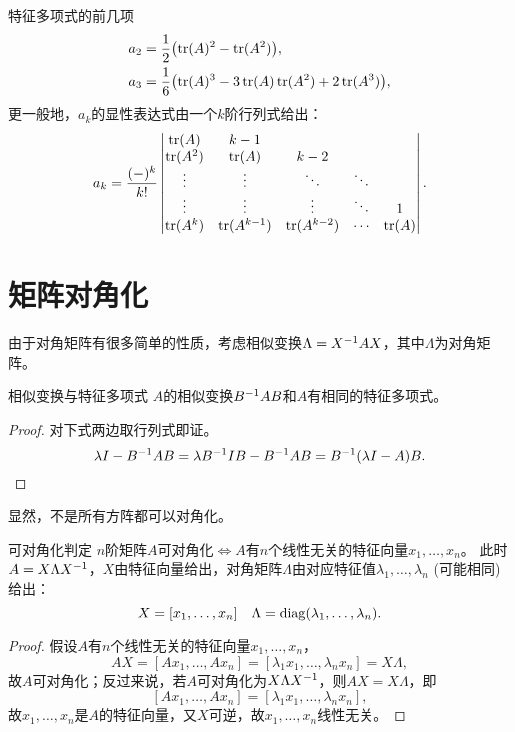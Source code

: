 \begin{example}
	{特征多项式的前几项}{}
	\begin{subequations}
		\begin{align}
			a_2&=\frac12\bigl(\operatorname{tr}(A)^2-\operatorname{tr}(A^2)\bigr),\\
			a_3&=\frac16\bigl(\operatorname{tr}(A)^3-3\operatorname{tr}(A)\operatorname{tr}(A^2)+2\operatorname{tr}(A^3)\bigr),
		\end{align}
	\end{subequations}
	更一般地，$a_k$的显性表达式由一个$k$阶行列式给出：
	\begin{equation}
		a_k=\frac{(-)^k}{k!}\begin{vmatrix}
			\operatorname{tr}(A)&k-1\\
			\operatorname{tr}(A^2)&\operatorname{tr}(A)&k-2\\
			\vdots&\vdots&\ddots&\ddots\\
			\vdots&\vdots&\vdots&\ddots&1\\
			\operatorname{tr}(A^k)&\operatorname{tr}(A^{k-1})&\operatorname{tr}(A^{k-2})&\cdots&\operatorname{tr}(A)
		\end{vmatrix}.
	\end{equation}
\end{example}

\section{矩阵对角化}

由于对角矩阵有很多简单的性质，考虑相似变换$\Lambda=X^{-1} AX$，其中$\Lambda$为对角矩阵。

\begin{theorem}{相似变换与特征多项式}{}
	$A$的相似变换$B^{-1} AB$和$A$有相同的特征多项式。
\end{theorem}
\begin{proof} 
	对下式两边取行列式即证。
	\[
		\lambda I-B^{-1} AB=\lambda B^{-1} IB-B^{-1} AB=B^{-1}(\lambda I-A)B.
		\qedhere
	\]
\end{proof}

显然，不是所有方阵都可以对角化。

\begin{theorem}{可对角化判定}{}
	$n$阶矩阵$A$可对角化$\iff A$有$n$个线性无关的特征向量$x_1,\ldots,x_n$。
	\tcblower
	此时$A=X\Lambda X^{-1}$，$X$由特征向量给出，对角矩阵$\Lambda$由对应特征值$\lambda_1,\ldots,\lambda_n$ (可能相同)给出：
	\begin{equation}
		X=[x_1,\ldots,x_n]
		\quad
	\Lambda=\operatorname{diag}(\lambda_1,\ldots,\lambda_n).
	\end{equation}
\end{theorem}
\begin{proof}
	假设$A$有$n$个线性无关的特征向量$x_1,\ldots,x_n$，
	\[
		AX=[Ax_1,\ldots,Ax_n]=[\lambda_1x_1,\ldots,\lambda_nx_n]=X\Lambda,
	\]
	故$A$可对角化；反过来说，若$A$可对角化为$X\Lambda X^{-1}$，则$AX=X\Lambda$，即
	\[
		[Ax_1,\ldots,Ax_n]=[\lambda_1x_1,\ldots,\lambda_nx_n],
	\]
	故$x_1,\ldots,x_n$是$A$的特征向量，又$X$可逆，故$x_1,\ldots,x_n$线性无关。
\end{proof}

